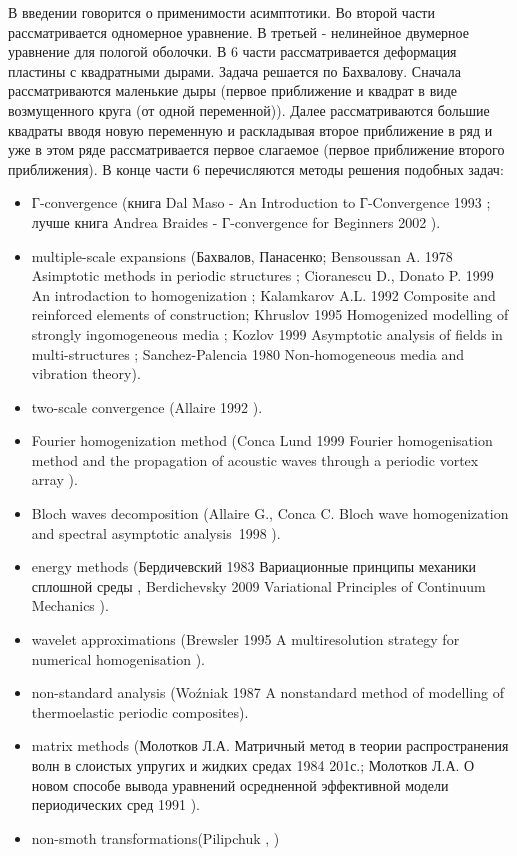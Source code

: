 \documentclass[12pt,a4paper]{article}
\begin{document}
В введении говорится о применимости асимптотики. Во второй части рассматривается одномерное уравнение. В третьей - нелинейное двумерное уравнение для пологой оболочки. В 6 части рассматривается деформация пластины с квадратными дырами. Задача решается по Бахвалову. Сначала рассматриваются маленькие дыры (первое приближение и квадрат в виде возмущенного круга (от одной переменной)). Далее рассматриваются большие квадраты вводя новую переменную и раскладывая второе приближение в ряд и уже в этом ряде рассматривается первое слагаемое (первое приближение второго приближения). В конце части 6 перечисляются методы решения подобных задач:
\begin{itemize}
\item Г-convergence (книга Dal Maso - An Introduction to Г-Convergence 1993 \cite{Maso1993}; лучше книга Andrea Braides - Г-convergence for Beginners 2002 \cite{Braides2002}).
\item multiple-scale expansions (Бахвалов, Панасенко; Bensoussan A. 1978 Asimptotic methods in periodic structures \cite{Bensoussan1978}; Cioranescu D., Donato P. 1999 An introdaction to homogenization \cite{Cioranescu2000}; Kalamkarov A.L. 1992 Composite and reinforced elements of construction; Khruslov 1995 Homogenized modelling of strongly ingomogeneous media \cite{Marchenko1974}; Kozlov 1999 Asymptotic analysis of fields in multi-structures \cite{Kozlov1999}; Sanchez-Palencia 1980 Non-homogeneous media and vibration theory).
\item two-scale convergence (Allaire 1992 \cite{Allaire1992}).
\item Fourier homogenization method (Conca Lund 1999 Fourier homogenisation method and the propagation of acoustic waves through a periodic vortex array \cite{Conca1999}).
\item Bloch waves decomposition (Allaire G., Conca C. Bloch wave homogenization and spectral asymptotic analysis~1998 \cite{Conca1998}). 
\item energy methods (Бердичевский 1983 Вариационные принципы механики сплошной среды \cite{Berdichevsky1983}, Berdichevsky 2009 Variational Principles of Continuum Mechanics \cite{Berdichevsky2009}).
\item wavelet approximations (Brewsler 1995 A multiresolution strategy for numerical homogenisation \cite{Brewsler1995}).
\item non-standard analysis (Woźniak 1987 A nonstandard method of modelling of thermoelastic periodic composites).
\item matrix methods (Молотков Л.А. Матричный метод в теории распространения волн в слоистых упругих и жидких средах 1984 201с.;  Молотков Л.А. О новом способе вывода уравнений осредненной эффективной модели периодических сред 1991 \cite{Molotkov1991}).
\item non-smoth transformations(Pilipchuk \cite{Pilipchuk 1999}, \cite{Pilipchuk1997})
\end{itemize}
\end{document}
